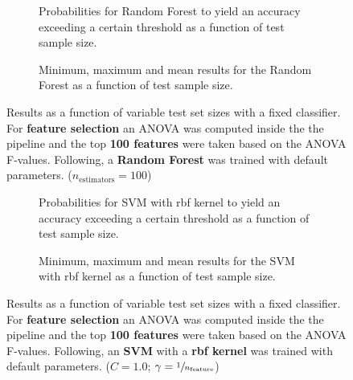 \begin{figure}
    \captionsetup[subfigure]{justification=justified,singlelinecheck=false}
    \begin{subfigure}[t]{0.61\textwidth}
        
        \caption{Probabilities for Random Forest to yield an accuracy exceeding a certain threshold as a function of test sample size.}
    \end{subfigure}
    \hspace{3.0mm}
    \begin{subfigure}[t]{0.34\textwidth}
        
        \caption{Minimum, maximum and mean results for the Random Forest as a function of test sample size.}
    \end{subfigure}
    \caption[Effects of varying test sample size. Random Forest; Preprocessing: ANOVA feature selection ($k_\text{best} = \num{100}$)]{Results as a function of variable test set sizes with a fixed classifier. For \textbf{feature selection} an ANOVA was computed inside the the pipeline and the top \textbf{\num{100} features} were taken based on the ANOVA F-values. Following, a \textbf{{Random Forest}} was trained with default parameters. ($n_\text{estimators}=\num{100}$)}
    \label{fig:no_PCA_100_best_selected_RandomForest}
\end{figure}

\begin{figure}
    \captionsetup[subfigure]{justification=justified,singlelinecheck=false}
    \begin{subfigure}[t]{0.61\textwidth}
        
        \caption{Probabilities for SVM with rbf kernel to yield an accuracy exceeding a certain threshold as a function of test sample size.}
    \end{subfigure}
    \hspace{3.0mm}
    \begin{subfigure}[t]{0.34\textwidth}
        
        \caption{Minimum, maximum and mean results for the SVM with rbf kernel as a function of test sample size.}
    \end{subfigure}
    \caption[Effects of varying test sample size. SVM (kernel = rbf); Preprocessing: ANOVA feature selection ($k_\text{best} = \num{100}$)]{Results as a function of variable test set sizes with a fixed classifier. For \textbf{feature selection} an ANOVA was computed inside the the pipeline and the top \textbf{\num{100} features} were taken based on the ANOVA F-values. Following, an \textbf{{SVM}} with a \textbf{{rbf kernel}} was trained with default parameters. ($C=\num{1.0}$; $\gamma=\sfrac{1}{n_\text{feature}}$)}
    \label{fig:no_PCA_100_best_selected_SVC}
\end{figure}

